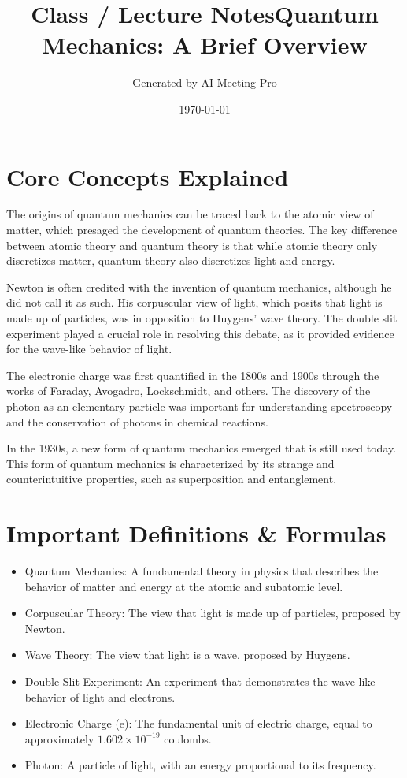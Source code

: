 \documentclass{article}
\title{Class / Lecture Notes}
\author{Generated by AI Meeting Pro}
\date{\today}
\begin{document}
\maketitle
\title{Quantum Mechanics: A Brief Overview}
\author{}
\date{}
\maketitle

\section*{Core Concepts Explained}

The origins of quantum mechanics can be traced back to the atomic view of matter, which presaged the development of quantum theories. The key difference between atomic theory and quantum theory is that while atomic theory only discretizes matter, quantum theory also discretizes light and energy.

Newton is often credited with the invention of quantum mechanics, although he did not call it as such. His corpuscular view of light, which posits that light is made up of particles, was in opposition to Huygens' wave theory. The double slit experiment played a crucial role in resolving this debate, as it provided evidence for the wave-like behavior of light.

The electronic charge was first quantified in the 1800s and 1900s through the works of Faraday, Avogadro, Lockschmidt, and others. The discovery of the photon as an elementary particle was important for understanding spectroscopy and the conservation of photons in chemical reactions.

In the 1930s, a new form of quantum mechanics emerged that is still used today. This form of quantum mechanics is characterized by its strange and counterintuitive properties, such as superposition and entanglement.

\section*{Important Definitions \& Formulas}

\begin{itemize}
    \item Quantum Mechanics: A fundamental theory in physics that describes the behavior of matter and energy at the atomic and subatomic level.
    \item Corpuscular Theory: The view that light is made up of particles, proposed by Newton.
    \item Wave Theory: The view that light is a wave, proposed by Huygens.
    \item Double Slit Experiment: An experiment that demonstrates the wave-like behavior of light and electrons.
    \item Electronic Charge (e): The fundamental unit of electric charge, equal to approximately $1.602 \times 10^{-19}$ coulombs.
    \item Photon: A particle of light, with an energy proportional to its frequency.
\end{itemize}
\end{document}
